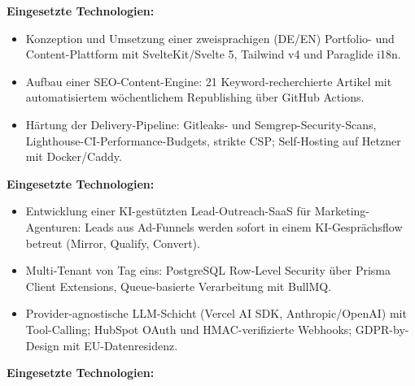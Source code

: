 \documentclass[10pt,a4paper,normalphoto]{altacv}
\begin{document}
\begin{fullwidth}
\textbf{Eingesetzte Technologien:}\\[0.4em]

\vspace{1.5em}

\begin{itemize}
    \item Konzeption und Umsetzung einer zweisprachigen (DE/EN) Portfolio- und Content-Plattform mit SvelteKit/Svelte 5, Tailwind v4 und Paraglide i18n.
    \item Aufbau einer SEO-Content-Engine: 21 Keyword-recherchierte Artikel mit automatisiertem wöchentlichem Republishing über GitHub Actions.
    \item Härtung der Delivery-Pipeline: Gitleaks- und Semgrep-Security-Scans, Lighthouse-CI-Performance-Budgets, strikte CSP; Self-Hosting auf Hetzner mit Docker/Caddy.
\end{itemize}

\textbf{Eingesetzte Technologien:}\\[0.4em]

\vspace{1.5em}

\begin{itemize}
    \item Entwicklung einer KI-gestützten Lead-Outreach-SaaS für Marketing-Agenturen: Leads aus Ad-Funnels werden sofort in einem KI-Gesprächsflow betreut (Mirror, Qualify, Convert).
    \item Multi-Tenant von Tag eins: PostgreSQL Row-Level Security über Prisma Client Extensions, Queue-basierte Verarbeitung mit BullMQ.
    \item Provider-agnostische LLM-Schicht (Vercel AI SDK, Anthropic/OpenAI) mit Tool-Calling; HubSpot OAuth und HMAC-verifizierte Webhooks; GDPR-by-Design mit EU-Datenresidenz.
\end{itemize}

\textbf{Eingesetzte Technologien:}\\[0.4em]


\end{fullwidth}
\end{document}
